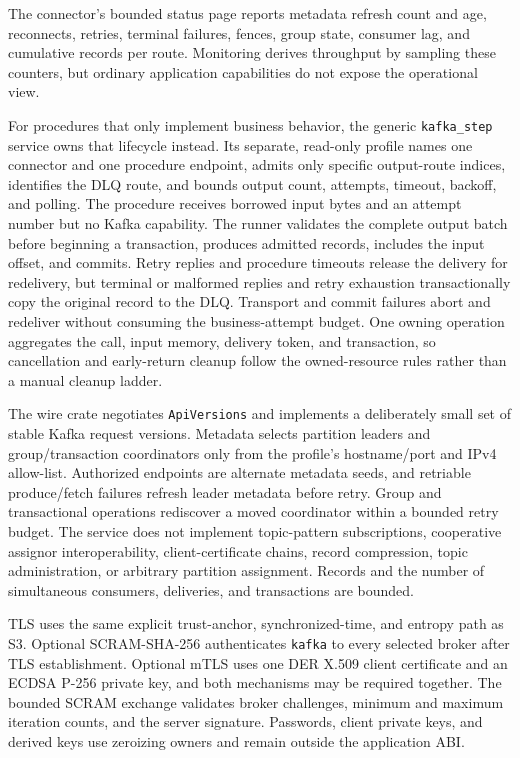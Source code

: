 The connector's bounded status page reports metadata refresh count and age,
reconnects, retries, terminal failures, fences, group state, consumer lag, and
cumulative records per route. Monitoring derives throughput by sampling these
counters, but ordinary application capabilities do not expose the operational view.

For procedures that only implement business behavior, the generic
\texttt{kafka\_step} service owns that lifecycle instead. Its separate,
read-only profile names one connector and one procedure endpoint, admits only
specific output-route indices, identifies the DLQ route, and bounds output
count, attempts, timeout, backoff, and polling. The procedure receives borrowed
input bytes and an attempt number but no Kafka capability. The runner validates
the complete output batch before beginning a transaction, produces admitted
records, includes the input offset, and commits. Retry replies and procedure
timeouts release the delivery for redelivery, but terminal or malformed replies
and retry exhaustion transactionally copy the original record to the DLQ.
Transport and commit failures abort and redeliver without consuming the
business-attempt budget. One owning operation aggregates the call, input
memory, delivery token, and transaction, so cancellation and early-return
cleanup follow the owned-resource rules rather than a manual cleanup ladder.

The wire crate negotiates \texttt{ApiVersions} and implements a deliberately
small set of stable Kafka request versions. Metadata selects partition leaders
and group/transaction coordinators only from the profile's hostname/port and
IPv4 allow-list. Authorized endpoints are alternate metadata seeds, and
retriable produce/fetch failures refresh leader metadata before retry.
Group and transactional operations rediscover a moved coordinator within a
bounded retry budget. The service does not implement topic-pattern
subscriptions, cooperative assignor interoperability, client-certificate
chains, record compression, topic administration, or arbitrary partition
assignment. Records and the number of simultaneous consumers, deliveries,
and transactions are bounded.

TLS uses the same explicit trust-anchor, synchronized-time, and entropy path as
S3. Optional SCRAM-SHA-256 authenticates \texttt{kafka} to every selected broker
after TLS establishment. Optional mTLS uses one DER X.509 client certificate
and an ECDSA P-256 private key, and both mechanisms may be required together. The
bounded SCRAM exchange validates broker challenges, minimum and maximum
iteration counts, and the server signature. Passwords, client private keys,
and derived keys use zeroizing owners and remain outside the application ABI.

